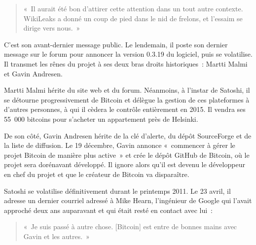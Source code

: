 \begin{quote}
«~Il aurait été bon d'attirer cette attention dans un tout autre contexte. WikiLeaks a donné un coup de pied dans le nid de frelons, et l'essaim se dirige vers nous.~»
\end{quote}

C'est son avant-dernier message public. Le lendemain, il poste son dernier message sur le forum pour annoncer la version 0.3.19 du logiciel, puis se volatilise. Il transmet les rênes du projet à ses deux bras droits historiques~: Martti Malmi et Gavin Andresen.

Martti Malmi hérite du site web et du forum. Néanmoins, à l'instar de Satoshi, il se détourne progressivement de Bitcoin et délègue la gestion de ces plateformes à d'autres personnes, à qui il cèdera le contrôle entièrement en 2015. Il vendra ses 55~000 bitcoins pour s'acheter un appartement près de Helsinki.

De son côté, Gavin Andresen hérite de la clé d'alerte, du dépôt SourceForge et de la liste de diffusion. Le 19 décembre, Gavin annonce «~commencer à gérer le projet Bitcoin de manière plus active~» et crée le dépôt GitHub de Bitcoin, où le projet sera dorénavant développé. Il ignore alors qu'il est devenu le développeur en chef du projet et que le créateur de Bitcoin va disparaître.

Satoshi se volatilise définitivement durant le printemps 2011. Le 23 avril, il adresse un dernier courriel adressé à Mike Hearn, l'ingénieur de Google qui l'avait approché deux ans auparavant et qui était resté en contact avec lui~:

\begin{quote}
«~Je suis passé à autre chose. [Bitcoin] est entre de bonnes mains avec Gavin et les autres.~» %
\end{quote}

